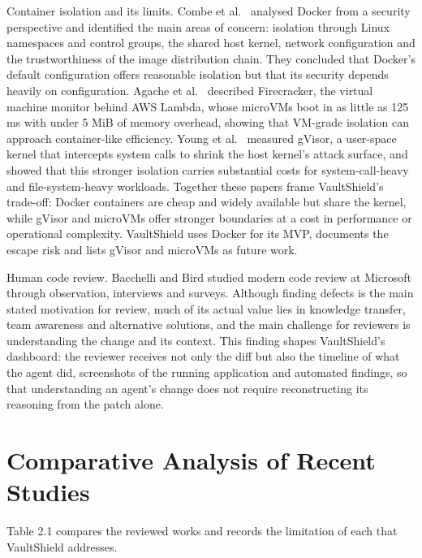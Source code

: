 \documentclass[12pt,a4paper,oneside]{report}
\begin{document}
Container isolation and its limits. Combe et al.~\cite{ref11} analysed Docker from a security perspective and identified the main areas of concern: isolation through Linux namespaces and control groups, the shared host kernel, network configuration and the trustworthiness of the image distribution chain. They concluded that Docker's default configuration offers reasonable isolation but that its security depends heavily on configuration. Agache et al.~\cite{ref12} described Firecracker, the virtual machine monitor behind AWS Lambda, whose microVMs boot in as little as 125 ms with under 5 MiB of memory overhead, showing that VM-grade isolation can approach container-like efficiency. Young et al.~\cite{ref13} measured gVisor, a user-space kernel that intercepts system calls to shrink the host kernel's attack surface, and showed that this stronger isolation carries substantial costs for system-call-heavy and file-system-heavy workloads. Together these papers frame VaultShield's trade-off: Docker containers are cheap and widely available but share the kernel, while gVisor and microVMs offer stronger boundaries at a cost in performance or operational complexity. VaultShield uses Docker for its MVP, documents the escape risk and lists gVisor and microVMs as future work.

Human code review. Bacchelli and Bird \cite{ref14} studied modern code review at Microsoft through observation, interviews and surveys. Although finding defects is the main stated motivation for review, much of its actual value lies in knowledge transfer, team awareness and alternative solutions, and the main challenge for reviewers is understanding the change and its context. This finding shapes VaultShield's dashboard: the reviewer receives not only the diff but also the timeline of what the agent did, screenshots of the running application and automated findings, so that understanding an agent's change does not require reconstructing its reasoning from the patch alone.

\section{Comparative Analysis of Recent Studies}\label{comparative-analysis-of-recent-studies}

Table 2.1 compares the reviewed works and records the limitation of each that VaultShield addresses.

\begingroup\small
\end{document}
